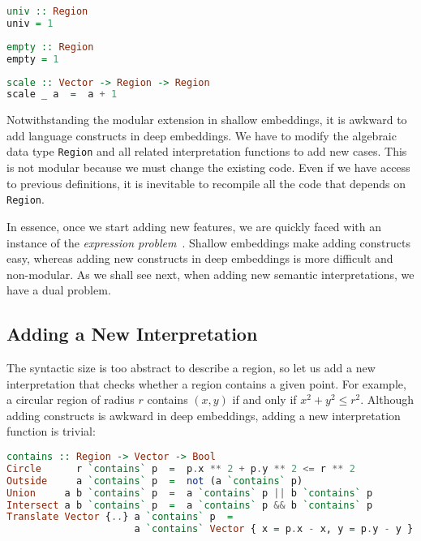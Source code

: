 \noindent
\begin{minipage}{0.25\textwidth}
\begin{lstlisting}[language=Haskell]
univ :: Region
univ = 1
\end{lstlisting}
\end{minipage}%
\begin{minipage}{0.25\textwidth}
\begin{lstlisting}[language=Haskell]
empty :: Region
empty = 1
\end{lstlisting}
\end{minipage}%
\begin{minipage}{0.5\textwidth}
\begin{lstlisting}[language=Haskell]
scale :: Vector -> Region -> Region
scale _ a  =  a + 1
\end{lstlisting}
\end{minipage}

\noindent
Notwithstanding the modular extension in shallow embeddings, it is awkward to
add language constructs in deep embeddings. We have to modify the algebraic data
type \lstinline{Region} and all related interpretation functions to add new
cases. This is not modular because we must change the existing code. Even if we
have access to previous definitions, it is inevitable to recompile all the code
that depends on \lstinline{Region}.

In essence, once we start adding new features, we are quickly faced with an
instance of the \emph{expression problem}~\citep{wadler1998expression}. Shallow
embeddings make adding constructs easy, whereas adding new constructs in deep
embeddings is more difficult and non-modular. As we shall see next, when adding
new semantic interpretations, we have a dual problem.

\subsection{Adding a New Interpretation} \label{sec:contains}

The syntactic size is too abstract to describe a region, so let us add a new
interpretation that checks whether a region contains a given point. For example,
a circular region of radius $r$ contains $(x,y)$ if and only if $x^2 + y^2 \le
r^2$. Although adding constructs is awkward in deep embeddings, adding a new
interpretation function is trivial:

\begin{lstlisting}[language=Haskell]
contains :: Region -> Vector -> Bool
Circle      r `contains` p  =  p.x ** 2 + p.y ** 2 <= r ** 2
Outside     a `contains` p  =  not (a `contains` p)
Union     a b `contains` p  =  a `contains` p || b `contains` p
Intersect a b `contains` p  =  a `contains` p && b `contains` p
Translate Vector {..} a `contains` p  =
                      a `contains` Vector { x = p.x - x, y = p.y - y }
\end{lstlisting}

